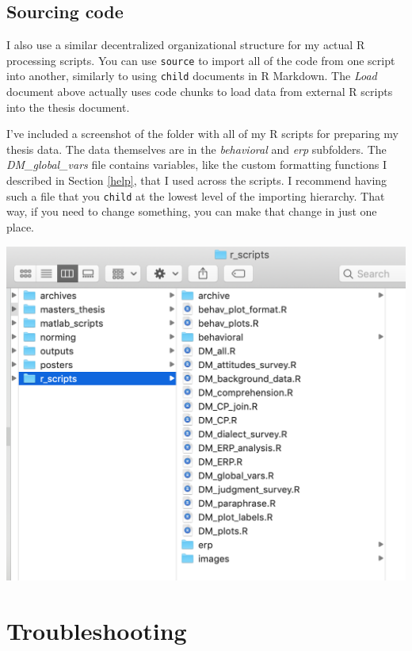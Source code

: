 \documentclass[
  openany]{book}
\begin{document}
\hypertarget{source}{%
\section{Sourcing code}\label{source}}

I also use a similar decentralized organizational structure for my actual R processing scripts. You can use \texttt{source} to import all of the code from one script into another, similarly to using \texttt{child} documents in R Markdown. The \emph{Load} document above actually uses code chunks to load data from external R scripts into the thesis document.

I've included a screenshot of the folder with all of my R scripts for preparing my thesis data. The data themselves are in the \emph{behavioral} and \emph{erp} subfolders. The \emph{DM\_global\_vars} file contains variables, like the custom formatting functions I described in Section \ref{help}, that I used across the scripts. I recommend having such a file that you \texttt{child} at the lowest level of the importing hierarchy. That way, if you need to change something, you can make that change in just one place.

\includegraphics[width=\textwidth]{images/content_organization_scripts}

\hypertarget{trouble}{%
\chapter{Troubleshooting}\label{trouble}}
\end{document}
